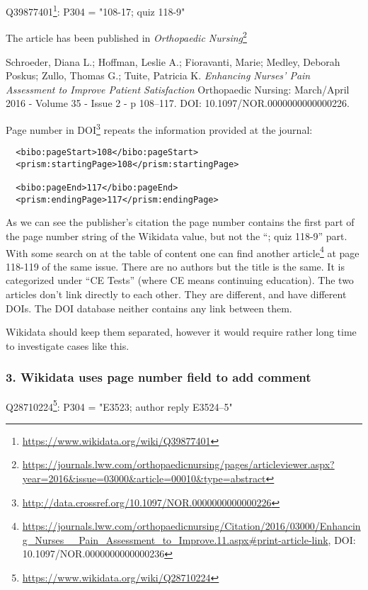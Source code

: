 Q39877401\footnote{\url{https://www.wikidata.org/wiki/Q39877401}}: P304 = "108-17; quiz 118-9"

The article has been published in \emph{Orthopaedic Nursing}\footnote{\url{https://journals.lww.com/orthopaedicnursing/pages/articleviewer.aspx?year=2016&issue=03000&article=00010&type=abstract}}

Schroeder, Diana L.; Hoffman, Leslie A.; Fioravanti, Marie; Medley, Deborah Poskus; Zullo, Thomas G.; Tuite, Patricia K. \emph{Enhancing Nurses' Pain Assessment to Improve Patient Satisfaction} Orthopaedic Nursing: March/April 2016 - Volume 35 - Issue 2 - p 108–117. DOI: 10.1097/NOR.0000000000000226.

Page number in DOI\footnote{\url{http://data.crossref.org/10.1097/NOR.0000000000000226}} repeats the information provided at the journal:

\begin{lstlisting}
  <bibo:pageStart>108</bibo:pageStart>
  <prism:startingPage>108</prism:startingPage>

  <bibo:pageEnd>117</bibo:pageEnd>
  <prism:endingPage>117</prism:endingPage>
\end{lstlisting}

As we can see the publisher's citation the page number contains the first part of the page number string of the Wikidata value, but not the ``; quiz 118-9'' part. With some search on at the table of content one can find another article\footnote{\url{https://journals.lww.com/orthopaedicnursing/Citation/2016/03000/Enhancing_Nurses__Pain_Assessment_to_Improve.11.aspx#print-article-link}, DOI: {10.1097/NOR.0000000000000236}} at page 118-119 of the same issue. There are no authors but the title is the same. It is categorized under ``CE Tests'' (where CE means continuing education). The two articles don't link directly to each other. They are different, and have different DOIs. The DOI database neither contains any link between them.

Wikidata should keep them separated, however it would require rather long time to investigate cases like this.

\subsubsection{3. Wikidata uses page number field to add comment}

Q28710224\footnote{\url{https://www.wikidata.org/wiki/Q28710224}}: P304 = "E3523; author reply E3524–5"

